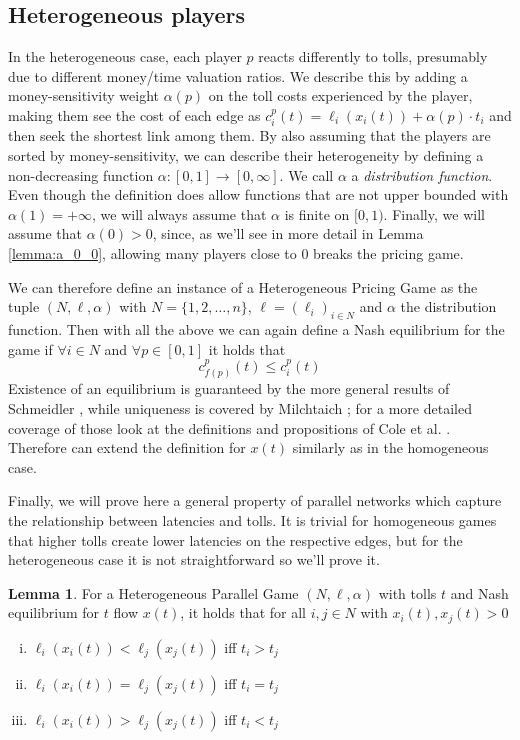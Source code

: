 \documentclass[10pt,a4paper]{book}
\theoremstyle{definition}
\newtheorem{lemma}[definition]{Lemma}
\theoremstyle{comment}
\begin{document}
\subsection*{Heterogeneous players}

In the heterogeneous case, each player $p$ reacts differently to tolls, presumably due to different money/time valuation ratios.
We describe this by adding a money-sensitivity weight $\alpha(p)$ on the toll costs experienced by the player, making them see the cost of each edge as $c_i^p(t) = \ell_i(x_i(t)) + \alpha(p) \cdot t_i$ and then seek the shortest link among them.
By also assuming that the players are sorted by money-sensitivity, we can describe their heterogeneity by defining a non-decreasing function $\alpha: [0, 1] \rightarrow [0, \infty]$.
We call $\alpha$ a \textit{distribution function}.
Even though the definition does allow functions that are not upper bounded with $\alpha(1) = +\infty$, we will always assume that $\alpha$ is finite on $[0, 1)$.
Finally, we will assume that $\alpha(0) > 0$, since, as we'll see in more detail in Lemma \ref{lemma:a_0_0}, allowing many players close to $0$ breaks the pricing game.

We can therefore define an instance of a Heterogeneous Pricing Game as the tuple $(N, \ell, \alpha)$ with $N = \{1, 2, \dots, n\}$, $\ell = (\ell_i)_{i \in N}$ and $\alpha$ the distribution function.
Then with all the above we can again define a Nash equilibrium for the game if $\forall i \in N$ and $\forall p \in [0, 1]$ it holds that
\[c_{f(p)}^p(t) \leq c_i^p(t)\]
Existence of an equilibrium is guaranteed by the more general results of Schmeidler \cite[Thm 2]{1973JSP.....7..295S}, while uniqueness is covered by Milchtaich \cite[Prop 3.3]{doi:10.1287/moor.25.3.349.12220}; for a more detailed coverage of those look at the definitions and propositions of Cole et al. \cite[\S2]{10.1145/780542.780618}.
Therefore can extend the definition for $x(t)$ similarly as in the homogeneous case.

Finally, we will prove here a general property of parallel networks which capture the relationship between latencies and tolls.
It is trivial for homogeneous games that higher tolls create lower latencies on the respective edges, but for the heterogeneous case it is not straightforward so we'll prove it.

\begin{lemma}
	\label{lemma:latencies_tolls}
	For a Heterogeneous Parallel Game $(N, \ell, \alpha)$ with tolls $t$ and Nash equilibrium for $t$ flow $x(t)$, it holds that for all $i, j \in N$ with $x_i(t), x_j(t) > 0$
	\begin{enumerate}[(i)]
		\item $\ell_i(x_i(t)) < \ell_j(x_j(t))$ iff $t_i > t_j$
		\item $\ell_i(x_i(t)) = \ell_j(x_j(t))$ iff $t_i = t_j$
		\item $\ell_i(x_i(t)) > \ell_j(x_j(t))$ iff $t_i < t_j$
	\end{enumerate}
\end{lemma}
\end{document}
